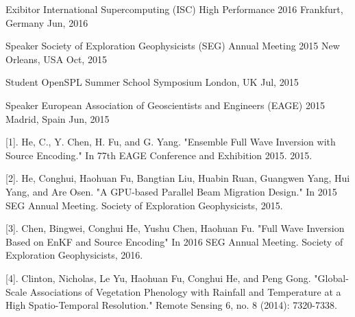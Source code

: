 \documentclass[11pt, a4paper]{awesome-cv}
\begin{document}
\begin{cventries}
\end{cventries}

\begin{cvhonors}

  \cvhonor
    {Exibitor} %
    {International Supercomputing (ISC) High Performance 2016} %
    {Frankfurt, Germany} %
    {Jun, 2016} %

  \cvhonor
    {Speaker} %
    {Society of Exploration Geophysicists (SEG) Annual Meeting 2015} %
    {New Orleans, USA}
    {Oct, 2015} %

  \cvhonor
    {Student} %
    {OpenSPL Summer School Symposium} %
    {London, UK} %
    {Jul, 2015} %

  \cvhonor
    {Speaker} %
    {European Association of Geoscientists and Engineers (EAGE) 2015} %
    {Madrid, Spain} %
    {Jun, 2015} %
\end{cvhonors}



\begin{cvparagraph}

[1]. He, C., Y. Chen, H. Fu, and G. Yang. "Ensemble Full Wave Inversion with Source Encoding." In 77th EAGE Conference and Exhibition 2015. 2015.

[2]. He, Conghui, Haohuan Fu, Bangtian Liu, Huabin Ruan, Guangwen Yang, Hui Yang, and Are Osen. "A GPU-based Parallel Beam Migration Design." In 2015 SEG Annual Meeting. Society of Exploration Geophysicists, 2015.

[3]. Chen, Bingwei, Conghui He, Yushu Chen, Haohuan Fu. "Full Wave Inversion Based on EnKF and Source Encoding" In 2016 SEG Annual Meeting. Society of Exploration Geophysicists, 2016.

[4]. Clinton, Nicholas, Le Yu, Haohuan Fu, Conghui He, and Peng Gong. "Global-Scale Associations of Vegetation Phenology with Rainfall and Temperature at a High Spatio-Temporal Resolution." Remote Sensing 6, no. 8 (2014): 7320-7338.
\end{cvparagraph}


\end{document}
